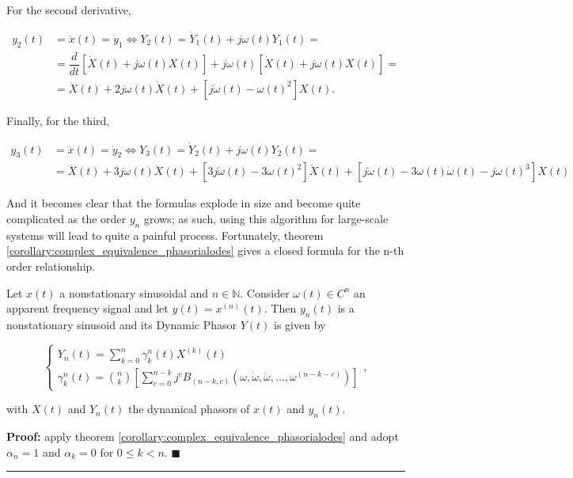 	For the second derivative, 

\begin{align}
	y_2(t) &= \ddot{x}(t) = \dot{y}_1 \Leftrightarrow Y_2(t) = \dot{Y}_1(t) + j\omega(t) Y_1(t) = \nonumber\\[3mm]
	&= \dfrac{d}{dt}\left[\dot{X}(t) + j\omega(t) X(t)\right] + j\omega(t)\left[\dot{X}(t) + j\omega(t) X(t)\right] = \nonumber\\[3mm]
	&= \ddot{X}(t) + 2j \omega(t) \dot{X}(t) + \left[ j \dot{\omega}(t) - \omega(t)^2 \right] X(t) . \label{eq:second_operator}
\end{align}

	Finally, for the third,

\begin{align}
	y_3(t) &= \dddot{x}(t) = \dot{y}_2 \Leftrightarrow Y_3(t) = \dot{Y}_2(t) + j\omega(t) Y_2(t) = \nonumber\\[3mm]
	&= \dddot{X}(t) + 3j \omega(t) \ddot{X}(t) + \left[ 3j \dot{\omega}(t) - 3 \omega(t)^2 \right] \dot{X}(t) + \left[ j \ddot{\omega}(t) - 3 \omega(t) \dot{\omega}(t) - j \omega(t)^3 \right] X(t) \label{eq:third_operator}
\end{align}

	And it becomes clear that the formulas explode in size and become quite complicated as the order $y_n$ grows; as such, using this algorithm for large-scale systems will lead to quite a painful process. Fortunately, theorem \ref{corollary:complex_equivalence_phasorialodes} gives a closed formula for the n-th order relationship.

\begin{theorem}\label{theo:nth_order_relationship} %
	Let $x(t)$ a nonstationary sinusoidal and $n\in \mathbb{N}$. Consider $\omega(t)\in C^n$ an apparent frequency signal and let $y(t) = x^{(n)}(t)$. Then $y_n(t)$ is a nonstationary sinusoid and its Dynamic Phasor $Y(t)$ is given by

\begin{equation}\left\{\begin{array}{l} \displaystyle Y_n(t) = \sum\limits_{k=0}^n \gamma_k^n(t) X^{(k)}(t) \\ \displaystyle \gamma_k^n(t) = {n\choose k} \left[\sum\limits_{c=0}^{n-k} j^cB_{\left(n-k,c\right)}\left(\omega,\dot{\omega},\ddot{\omega},...,\omega^{(n-k-c)}\right) \right]\end{array}\right. ,\label{eq:gamma_def}\end{equation}

	\noindent with $X(t)$ and $Y_n(t)$ the dynamical phasors of $x(t)$ and $y_n(t)$.
\end{theorem}
\textbf{Proof:} apply theorem \ref{corollary:complex_equivalence_phasorialodes} and adopt $\alpha_n = 1$ and $\alpha_k = 0$ for $0 \leq k < n$. \hfill$\blacksquare$\vspace{5mm}\hrule\vspace{5mm} %

